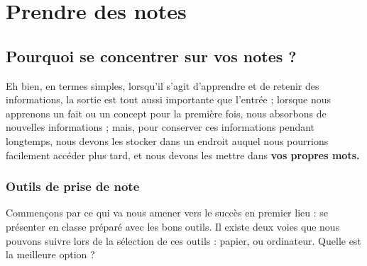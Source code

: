 \hypertarget{prendre-des-notes}{%
\chapter{Prendre des notes}\label{prendre-des-notes}}

\hypertarget{pourquoi-se-concentrer-sur-vos-notes}{%
\section{Pourquoi se concentrer sur vos notes
?}\label{pourquoi-se-concentrer-sur-vos-notes}}

Eh bien, en termes simples, lorsqu'il s'agit d'apprendre et de retenir
des informations, la sortie est tout aussi importante que l'entrée ;
lorsque nous apprenons un fait ou un concept pour la première fois, nous
absorbons de nouvelles informations ; mais, pour conserver ces
informations pendant longtemps, nous devons les stocker dans un endroit
auquel nous pourrions facilement accéder plus tard, et nous devons les
mettre dans \textbf{vos propres mots.}

\hypertarget{outils-de-prise-de-note}{%
\subsection{Outils de prise de note}\label{outils-de-prise-de-note}}

Commençons par ce qui va nous amener vers le succès en premier lieu : se
présenter en classe préparé avec les bons outils. Il existe deux voies
que nous pouvons suivre lors de la sélection de ces outils : papier, ou
ordinateur. Quelle est la meilleure option ? 

